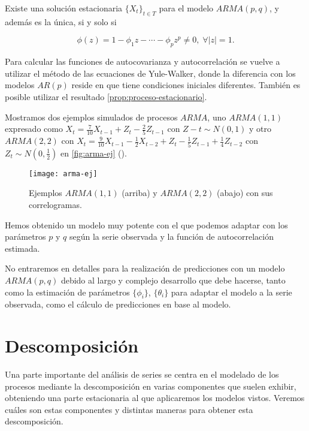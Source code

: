 \begin{teorema}
  Existe una solución estacionaria $\{X_t\}_{t \in T}$ para el modelo $ARMA(p, q)$, y además es la única, si y solo si

  $$\phi(z) = 1 - \phi_1 z - \cdots - \phi_p z^p \neq 0, \; \forall |z| = 1.$$
  \label{th:existencia-unicidad-arma}
\end{teorema}

Para calcular las funciones de autocovarianza y autocorrelación se vuelve a utilizar el método de las ecuaciones de Yule-Walker, donde la diferencia con los modelos $AR(p)$ reside en que tiene condiciones iniciales diferentes. También es posible utilizar el resultado \autoref{prop:proceso-estacionario}.

Mostramos dos ejemplos simulados de procesos $ARMA$, uno $ARMA(1,1)$ expresado como $X_t = \frac{7}{10}X_{t-1} + Z_t - \frac{2}{5}Z_{t-1}$ con $Z-t \sim N(0, 1)$ y otro $ARMA(2,2)$ con $X_t = \frac{9}{10}X_{t-1} - \frac{1}{2}X_{t-2} + Z_t - \frac{1}{5}Z_{t-1} + \frac{1}{4}Z_{t-2}$ con $Z_t \sim N(0, \frac{1}{2})$ en \autoref{fig:arma-ej} (\cite{chatfield2019analysis}).

\begin{figure}[htpb]
  \centering
  \texttt{[image: arma-ej]}
  \caption{Ejemplos $ARMA(1,1)$ (arriba) y $ARMA(2,2)$ (abajo) con sus correlogramas.}
  \label{fig:arma-ej}
\end{figure}

Hemos obtenido un modelo muy potente con el que podemos adaptar con los parámetros $p$ y $q$ según la serie observada y la función de autocorrelación estimada.

No entraremos en detalles para la realización de predicciones con un modelo $ARMA(p,q)$ debido al largo y complejo desarrollo que debe hacerse, tanto como la estimación de parámetros $\{\phi_i\}$, $\{\theta_i\}$ para adaptar el modelo a la serie observada, como el cálculo de predicciones en base al modelo.

\section{Descomposición}

Una parte importante del análisis de series se centra en el modelado de los procesos mediante la descomposición en varias componentes que suelen exhibir, obteniendo una parte estacionaria al que aplicaremos los modelos vistos. Veremos cuáles son estas componentes y distintas maneras para obtener esta descomposición.

